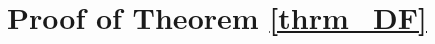 \documentclass[journal]{IEEEtran}
\begin{document}
\section{Proof of Theorem \ref{thrm_DF}}
\label{apdx_thrm_DF}

\ifCLASSOPTIONcaptionsoff
  \newpage
\fi

\end{document}
